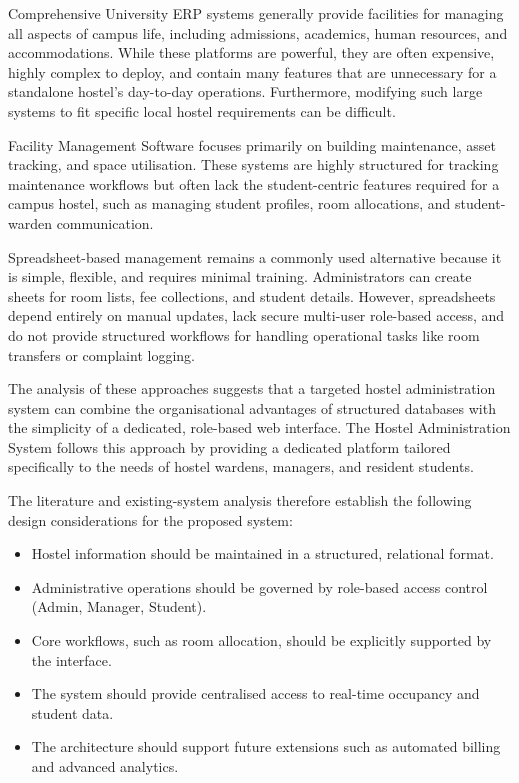 Comprehensive University ERP systems generally provide facilities for managing all aspects of campus life, including admissions, academics, human resources, and accommodations. While these platforms are powerful, they are often expensive, highly complex to deploy, and contain many features that are unnecessary for a standalone hostel's day-to-day operations. Furthermore, modifying such large systems to fit specific local hostel requirements can be difficult.

Facility Management Software focuses primarily on building maintenance, asset tracking, and space utilisation. These systems are highly structured for tracking maintenance workflows but often lack the student-centric features required for a campus hostel, such as managing student profiles, room allocations, and student-warden communication.

Spreadsheet-based management remains a commonly used alternative because it is simple, flexible, and requires minimal training. Administrators can create sheets for room lists, fee collections, and student details. However, spreadsheets depend entirely on manual updates, lack secure multi-user role-based access, and do not provide structured workflows for handling operational tasks like room transfers or complaint logging.

The analysis of these approaches suggests that a targeted hostel administration system can combine the organisational advantages of structured databases with the simplicity of a dedicated, role-based web interface. The Hostel Administration System follows this approach by providing a dedicated platform tailored specifically to the needs of hostel wardens, managers, and resident students.

The literature and existing-system analysis therefore establish the following design considerations for the proposed system:

\begin{itemize}
    \item Hostel information should be maintained in a structured, relational format.
    \item Administrative operations should be governed by role-based access control (Admin, Manager, Student).
    \item Core workflows, such as room allocation, should be explicitly supported by the interface.
    \item The system should provide centralised access to real-time occupancy and student data.
    \item The architecture should support future extensions such as automated billing and advanced analytics.
\end{itemize}

